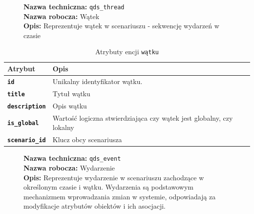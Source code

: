 \begin{figure}[H]
    \centering
    \begin{minipage}{0.8\textwidth} 
        \begin{framed}
            \noindent\textbf{\large Nazwa techniczna:} \texttt{qds\_thread} \\
            \textbf{\large Nazwa robocza:} Wątek \\
            \textbf{\large Opis:} Reprezentuje wątek w scenariuszu - sekwencję wydarzeń w czasie
        \end{framed}
    \end{minipage}
\end{figure}

\begin{table}[H]
    \centering
    \renewcommand{\arraystretch}{1.6}
    \begin{tabular}{|>{\bfseries}l|p{}|}
        \hline
        \rowcolor[HTML]{EFEFEF} \textbf{Atrybut} & \textbf{Opis} \\
        \hline
        \texttt{id} & Unikalny identyfikator wątku. \\
        \hline
        \texttt{title} & Tytuł wątku \\
        \hline
        \texttt{description} & Opis wątku \\
        \hline
        \texttt{is\_global} & Wartość logiczna stwierdziająca czy wątek jest globalny, czy lokalny \\
        \hline
        \texttt{scenario\_id} & Klucz obcy scenariusza \\
        \hline
    \end{tabular}
    \caption{Atrybuty encji \texttt{wątku}}
\end{table}

\begin{figure}[H]
    \centering
    \begin{minipage}{0.8\textwidth} 
        \begin{framed}
            \noindent\textbf{\large Nazwa techniczna:} \texttt{qds\_event} \\
            \textbf{\large Nazwa robocza:} Wydarzenie \\
            \textbf{\large Opis:} Reprezentuje wydarzenie w scenariuszu zachodzące w określonym czasie i wątku.
            Wydarzenia są podstawowym mechanizmem wprowadzania zmian w systemie,
            odpowiadają za modyfikacje atrybutów obiektów i ich asocjacji.
        \end{framed}
    \end{minipage}
\end{figure}

